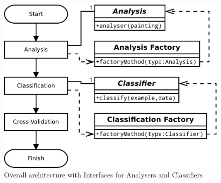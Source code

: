 \begin{figure}[h]
\centering
\includegraphics[width=\linewidth]{img/interfaces-arch}
\caption{Overall architecture with Interfaces for Analysers and Classifiers}\label{fig:interfaces-arch}
\end{figure}
